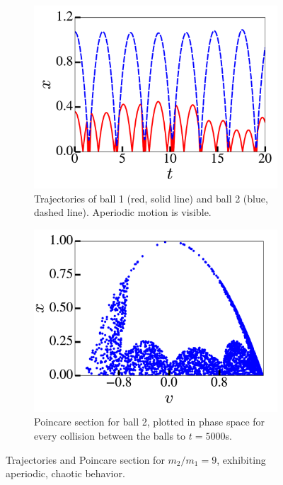 \documentclass[pra,twocolumn,showpacs,amsmath,amssymb, aps, 10pt]{revtex4-1}
\begin{document}
\begin{figure}
  \begin{subfigure}{0.8\linewidth}
    \includegraphics[width=\linewidth]{r0_1_traj}
    \caption{Trajectories of ball 1 (red, solid line) and ball 2 (blue, dashed line).
    Aperiodic motion is visible.}
    \label{fig:9-traj}
  \end{subfigure}

  \begin{subfigure}{\linewidth}
    \includegraphics[width=0.8\linewidth]{r0_1_poincare}
    \caption{Poincare section for ball 2, plotted in phase space for every collision
    between the balls to $t=5000$s.}
    \label{fig:9-poincare}
  \end{subfigure}

  \caption{Trajectories and Poincare section for $m_2/m_1 = 9$, exhibiting
  aperiodic, chaotic behavior.}
  \label{fig:9-chaotic}
\end{figure}
\end{document}
